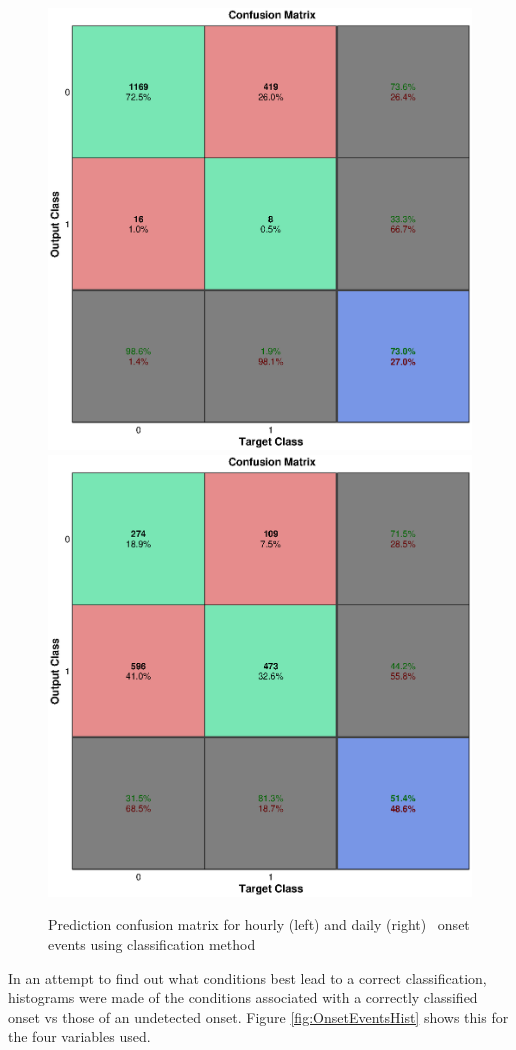 \begin{figure}[htp!]
	\centering
	\includegraphics[width=0.45\linewidth]{Figures/CH5/NNBinaryOnset-hourly.eps}
	\includegraphics[width=0.45\linewidth]{Figures/CH5/NNBinaryOnset-daily.eps}
	\caption{Prediction confusion matrix for hourly (left) and daily (right) \req\ onset events using classification method}
	\label{fig:OnsetEvents}
\end{figure}

In an attempt to find out what conditions best lead to a correct classification, histograms were made of the conditions associated with a correctly classified onset vs those of an undetected onset. Figure \ref{fig:OnsetEventsHist} shows this for the four variables used.

